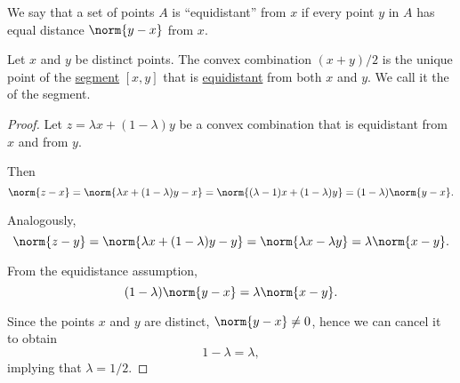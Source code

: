 \begin{definition}\label{def:equidistant_points}
  We say that a set of points \( A \) is \enquote{equidistant} from \( x \) if every point \( y \) in \( A \) has equal distance \( \norm{y - x} \) from \( x \).
\end{definition}

\begin{proposition}\label{thm:segment_midpoint}
  Let \( x \) and \( y \) be distinct points. The convex combination \( (x + y) / 2 \) is the unique point of the \hyperref[def:line_segment]{segment} \( [x, y] \) that is \hyperref[def:equidistant_points]{equidistant} from both \( x \) and \( y \). We call it the  of the segment.
\end{proposition}
\begin{proof}
  Let \( z = \lambda x + (1 - \lambda) y \) be a convex combination that is equidistant from \( x \) and from \( y \).

  Then
  \begin{equation*}
    \norm{ z - x }
    =
    \norm{ \lambda x + (1 - \lambda) y - x }
    =
    \norm{ (\lambda - 1) x + (1 - \lambda) y }
    =
    (1 - \lambda) \norm{ y - x }.
  \end{equation*}

  Analogously,
  \begin{equation*}
    \norm{ z - y }
    =
    \norm{ \lambda x + (1 - \lambda) y - y }
    =
    \norm{ \lambda x - \lambda y }
    =
    \lambda \norm{ x - y }.
  \end{equation*}

  From the equidistance assumption,
  \begin{equation*}
    (1 - \lambda) \norm{ y - x } = \lambda \norm{ x - y }.
  \end{equation*}

  Since the points \( x \) and \( y \) are distinct, \( \norm{ y - x } \neq 0 \), hence we can cancel it to obtain
  \begin{equation*}
    1 - \lambda = \lambda,
  \end{equation*}
  implying that \( \lambda = 1 / 2 \).
\end{proof}
